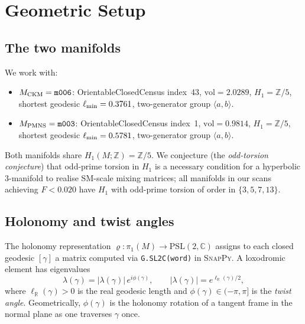 \documentclass[a4paper,11pt]{article}
\newcommand{\PSL}{\mathrm{PSL}(2,\mathbb{C})}
\newcommand{\pioneM}{\pi_1(M)}
\newcommand{\mfld}[1]{\texttt{#1}}
\begin{document}
\section{Geometric Setup}
\label{sec:setup}

\subsection{The two manifolds}

We work with:
\begin{itemize}
\item $M_{\rm CKM} = \mfld{m006}$: OrientableClosedCensus index~43,
      $\mathrm{vol}=2.0289$, $H_1=\mathbb{Z}/5$,
      shortest geodesic $\ell_{\rm min}=0.3761$,
      two-generator group $\langle a,b\rangle$.
\item $M_{\rm PMNS} = \mfld{m003}$: OrientableClosedCensus index~1,
      $\mathrm{vol}=0.9814$, $H_1=\mathbb{Z}/5$,
      shortest geodesic $\ell_{\rm min}=0.5781$,
      two-generator group $\langle a,b\rangle$.
\end{itemize}
Both manifolds share $H_1(M;\mathbb{Z})=\mathbb{Z}/5$.
We conjecture (the \emph{odd-torsion conjecture}) that odd-prime torsion
in $H_1$ is a necessary condition for a hyperbolic 3-manifold to realise
SM-scale mixing matrices; all manifolds in our scans achieving $F<0.020$
have $H_1$ with odd-prime torsion of order in $\{3,5,7,13\}$.

\subsection{Holonomy and twist angles}

The holonomy representation $\varrho:\pioneM\to\PSL$ assigns to each closed
geodesic $[\gamma]$ a matrix computed via \texttt{G.SL2C(word)} in \textsc{SnapPy}.
A loxodromic element has eigenvalues
\begin{equation}
  \lambda(\gamma) = |\lambda(\gamma)|\,e^{i\phi(\gamma)},\qquad
  |\lambda(\gamma)| = e^{\ell_{\mathbb{R}}(\gamma)/2},
  \label{eq:eigenvalue}
\end{equation}
where $\ell_{\mathbb{R}}(\gamma)>0$ is the real geodesic length and
$\phi(\gamma)\in(-\pi,\pi]$ is the \emph{twist angle}.
Geometrically, $\phi(\gamma)$ is the holonomy rotation of a tangent frame
in the normal plane as one traverses $\gamma$ once.
\end{document}
